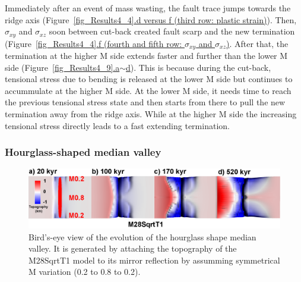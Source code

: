 Immediately after an event of mass wasting, the fault trace jumps towards the ridge axis (Figure~\hyperref[fig_Results4_4]{\ref{fig_Results4_4}.d versus f (third row: plastic strain)}). 
Then, $\sigma_{xy}$ and $\sigma_{xz}$ soon  between cut-back created fault scarp and the new termination (Figure~\hyperref[fig_Results4_4]{\ref{fig_Results4_4}.f (fourth and fifth row: $\sigma_{xy}$ and $\sigma_{xz}$)}. 
After that, the termination at the higher M side extends faster and further than the lower M side (Figure~\hyperref[fig_Results4_9]{\ref{fig_Results4_9}.a$\sim$d}). This is because during the cut-back, tensional stress due to bending is released at the lower M side but continues to accummulate at the higher M side. At the lower M side, it needs time to reach the previous tensional stress state and then starts from there to pull the new termination away from the ridge axis. While at the higher M side the increasing tensional stress directly leads to a fast extending termination.


\subsubsection{Hourglass-shaped median valley}

\begin{figure}[h]
  \centering
    \includegraphics[width=1.0\textwidth]{./Figures/fig_Results_3_2_hourglass_evolution.eps}
  \caption{Bird's-eye view of the evolution of the hourglass shape median valley. It is generated by attaching the topography of the M28SqrtT1 model to its mirror reflection by assumming symmetrical M variation (0.2 to 0.8 to 0.2). }
 \label{fig_Results_3_2_hourglass_evolution}
\end{figure}

